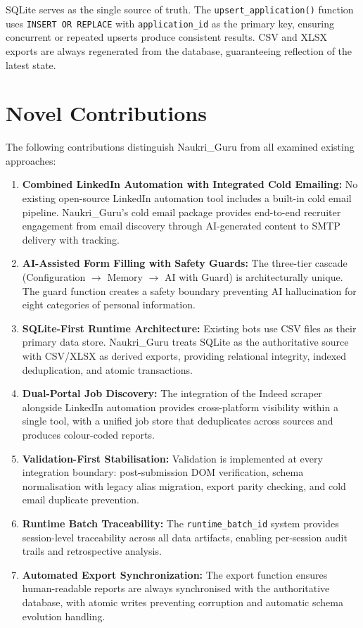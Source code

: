 \documentclass[12pt, a4paper, oneside]{report}
\begin{document}
SQLite serves as the single source of truth. The \texttt{upsert\_application()} function uses \texttt{INSERT OR REPLACE} with \texttt{application\_id} as the primary key, ensuring concurrent or repeated upserts produce consistent results. CSV and XLSX exports are always regenerated from the database, guaranteeing reflection of the latest state.


\section{Novel Contributions}
\label{sec:novel-contributions}

The following contributions distinguish Naukri\_Guru from all examined existing approaches:

\begin{enumerate}
    \item \textbf{Combined LinkedIn Automation with Integrated Cold Emailing:} No existing open-source LinkedIn automation tool includes a built-in cold email pipeline. Naukri\_Guru's cold email package provides end-to-end recruiter engagement from email discovery through AI-generated content to SMTP delivery with tracking.

    \item \textbf{AI-Assisted Form Filling with Safety Guards:} The three-tier cascade (Configuration $\to$ Memory $\to$ AI with Guard) is architecturally unique. The guard function creates a safety boundary preventing AI hallucination for eight categories of personal information.

    \item \textbf{SQLite-First Runtime Architecture:} Existing bots use CSV files as their primary data store. Naukri\_Guru treats SQLite as the authoritative source with CSV/XLSX as derived exports, providing relational integrity, indexed deduplication, and atomic transactions.

    \item \textbf{Dual-Portal Job Discovery:} The integration of the Indeed scraper alongside LinkedIn automation provides cross-platform visibility within a single tool, with a unified job store that deduplicates across sources and produces colour-coded reports.

    \item \textbf{Validation-First Stabilisation:} Validation is implemented at every integration boundary: post-submission DOM verification, schema normalisation with legacy alias migration, export parity checking, and cold email duplicate prevention.

    \item \textbf{Runtime Batch Traceability:} The \texttt{runtime\_batch\_id} system provides session-level traceability across all data artifacts, enabling per-session audit trails and retrospective analysis.

    \item \textbf{Automated Export Synchronization:} The export function ensures human-readable reports are always synchronised with the authoritative database, with atomic writes preventing corruption and automatic schema evolution handling.
\end{enumerate}
\end{document}
